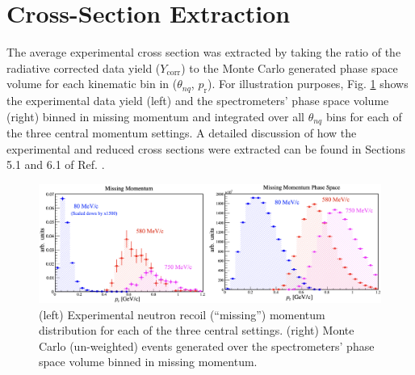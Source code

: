 \documentclass[aps, prl]{revtex4-2}  %
\begin{document}
\section{\large Cross-Section Extraction}
\indent The average experimental cross section was extracted by taking the ratio of the radiative corrected data yield ($Y_{\mathrm{corr}}$) to the Monte Carlo generated phase space volume for each
kinematic bin in ($\theta_{nq}$, $p_{\mathrm{r}}$). For illustration purposes, Fig. \ref{fig:Pm_Ps} shows the experimental data yield (left) and the spectrometers' phase space volume (right) binned in
missing momentum and integrated over all $\theta_{nq}$ bins for each of the three central momentum settings. A detailed discussion of how the experimental and reduced cross sections were extracted can be
found in Sections 5.1 and 6.1 of Ref. \cite{cyero_phdthesis}.
\begin{figure}[!h]
\includegraphics[scale=0.3]{plots/Pr_and_Ps.png}
\caption{(left) Experimental neutron recoil (``missing'') momentum distribution for each of the three central settings. (right) Monte Carlo (un-weighted) events generated over
  the spectrometers' phase space volume binned in missing momentum.}
\label{fig:Pm_Ps}
\end{figure}
\end{document}
